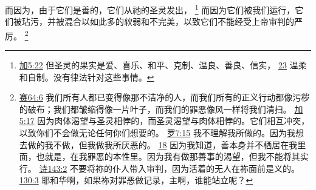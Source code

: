 \documentclass[12pt, a4paper, oneside]{ctexart}
\begin{document}
	而因为，由于它们是善的，它们从祂的圣灵发出，
	\footnote {
		\href{https://biblehub.com/galatians/5-22.htm}{加5:22} 但圣灵的果实是爱、喜乐、和平、克制、温良、善良、信实，
		\href{https://biblehub.com/galatians/5-23.htm}{23} 温柔和自制。没有律法针对这些事情。
	}
	而因为它们被我们运行，它们被玷污，并被混合以如此多的软弱和不完美，以致它们不能经受上帝审判的严厉。
	\footnote {
		\href{https://biblehub.com/isaiah/64-6.htm}{赛64:6} 我们所有人都已变得像那不洁净的人，而我们所有的正义行动都像污秽的破布；我们都皱缩得像一片叶子，而我们的罪恶像风一样将我们清扫。
		\href{https://biblehub.com/galatians/5-17.htm}{加5:17} 因为肉体渴望与圣灵相悖的，而圣灵渴望与肉体相悖的。它们相互冲突，以致你们不会做无论任何你们想要的。
		\href{https://biblehub.com/romans/7-15.htm}{罗7:15} 我不理解我所做的。因为我想去做的我不做，但我做我所厌恶的。
		\href{https://biblehub.com/romans/7-18.htm}{18} 因为我知道，善本身并不栖居在我里面，也就是，在我罪恶的本性里。因为我有做那善事的渴望，但我不能将其实行。
		\href{https://biblehub.com/psalms/143-2.htm}{诗143:2} 不要将祢的仆人带入审判，因为活着的无人在祢面前是义的。
		\href{https://biblehub.com/psalms/130-3.htm}{130:3} 耶和华啊，如果祢对罪恶做记录，主啊，谁能站立呢？
	}
\end{document}
